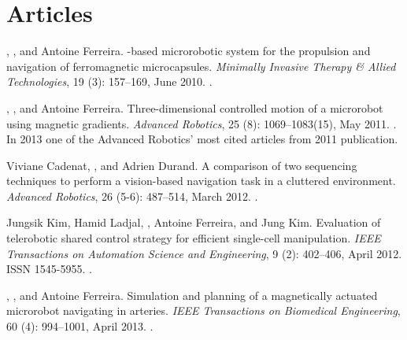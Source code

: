 
\section{Articles}

\begin{Mybibliography}{99}

  \KBelharet, \DavidFolio, and Antoine Ferreira.
  \newblock {\MRI}-based microrobotic system for the propulsion and navigation of
  ferromagnetic microcapsules.
  \newblock \emph{Minimally Invasive Therapy \& Allied Technologies}, 19
  (3): 157--169, June 2010{}.
  \newblock {}.
  
  \KBelharet, \DavidFolio, and Antoine Ferreira.
  \newblock Three-dimensional controlled motion of a microrobot using magnetic
  gradients.
  \newblock \emph{Advanced Robotics}, 25 (8): 1069--1083(15),
  May 2011.
  \newblock {}.
  \newblock In 2013 one of the Advanced Robotics' most cited articles from 2011
  publication.
  
 
 Viviane Cadenat, \DavidFolio, and Adrien Durand.
 \newblock A comparison of two sequencing techniques to perform a vision-based
 navigation task in a cluttered environment.
 \newblock \emph{Advanced Robotics}, 26 (5-6): 487--514, March
 2012.
 \newblock {}.
  
  Jungsik Kim, Hamid Ladjal, \DavidFolio, Antoine Ferreira, and Jung Kim.
  \newblock Evaluation of telerobotic shared control strategy for efficient
  single-cell manipulation.
  \newblock \emph{{IEEE} Transactions on Automation Science and Engineering},
  9 (2): 402--406, April 2012.
  \newblock ISSN 1545-5955.
  \newblock {}.

  
  \KBelharet, \DavidFolio, and Antoine Ferreira.
  \newblock Simulation and planning of a magnetically actuated microrobot
  navigating in arteries.
  \newblock \emph{{IEEE} Transactions on Biomedical Engineering}, 60
  (4): 994--1001, April 2013{}.
  \newblock {}.
  

\end{Mybibliography}

